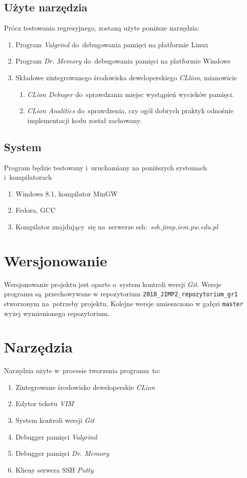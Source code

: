 \documentclass[a4paper,11pt]{article}
\begin{document}
		\subsection{Użyte narzędzia}
		Prócz testowania regresyjnego, zostaną użyte poniższe narzędzia:
			\begin{enumerate}
				\item Program \textsl{Valgrind} do~debugowania pamięci na platformie Linux
				\item Program \textsl{Dr. Memory} do~debugowania pamięci na platformie Windows
				\item Składowe zintegrowanego środowiska deweloperskiego \textsl{CLlion}, mianowicie 
					\begin{enumerate}
						\item \textsl{CLion Debuger} do~sprawdzania miejsc wystąpień wycieków pamięci.
						\item \textsl{CLion Analitics} do~sprawdzenia, czy ogól dobrych praktyk odnośnie implementacji kodu został zachowany.
					\end{enumerate} 
			\end{enumerate}
		\subsection{System}
			Program będzie testowany i~uruchamiany na poniższych systemach i~kompilatorach
				\begin{enumerate}
					\item Windows 8.1, kompilator MinGW
					\item Fedora, GCC
					\item Kompilator znajdujący~się na~serwerze ssh:~\textit{ssh.jimp.iem.pw.edu.pl}
				\end{enumerate}
	\newpage
	\section{Wersjonowanie}
		Wersjonowanie projektu jest oparte o~system kontroli wersji \textsl{Git}. Wersje programu są~przechowywane w repozytorium \texttt{2018\_JIMP2\_repozytorium\_gr1} stworzonym na~potrzeby projektu. Kolejne wersje umieszczono w gałęzi \texttt{master} wyżej wymienionego repozytorium.
	\section{Narzędzia}	
		Narzędzia użyte w~procesie tworzenia programu~to:
			\begin{enumerate}
				\item Zintegrowane środowisko deweloperskie \textsl{CLion}
				\item Edytor tekstu \textsl{VIM}
				\item System kontroli wersji \textsl{Git}
				\item Debugger pamięci \textsl{Valgrind}
				\item Debugger pamięci \textsl{Dr. Memory}
				\item Klieny serwera SSH \textsl{Putty}
			\end{enumerate}
\end{document}
